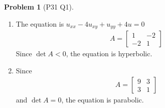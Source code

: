 \documentclass[twoside,11pt]{article}
\theoremstyle{definition}
\newtheorem{problem}{Problem}
\theoremstyle{remark}
\begin{document}
\begin{problem}[P31 Q1]
    \begin{enumerate}[label=(\alph*)]\
        \item The equation is $u_{xx} -4u_{xy} + u_{yy} + 4u = 0$
        \begin{align*}
            A = \begin{bmatrix}
                1 & -2\\
                -2 & 1
            \end{bmatrix}
        \end{align*}
        Since $\det A < 0$, the equation is hyperbolic.

        \item Since
        \begin{align*}
            A = \begin{bmatrix}
                9 & 3\\
                3 & 1
            \end{bmatrix}
        \end{align*}
        and $\det A = 0$, the equation is parabolic.
    \end{enumerate}
\end{problem}

\end{document}
